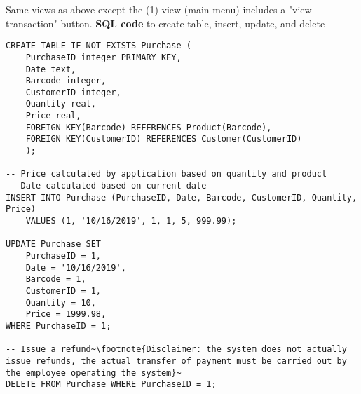 \documentclass[notitlepage,11pt]{article}
\begin{document}
	Same views as above except the (1) view (main menu) includes a "view transaction" button.
\newpage
\textbf{SQL code} to create table, insert, update, and delete
\begin{lstlisting}
CREATE TABLE IF NOT EXISTS Purchase (
	PurchaseID integer PRIMARY KEY,
	Date text,
	Barcode integer, 
	CustomerID integer,
	Quantity real,
	Price real,
	FOREIGN KEY(Barcode) REFERENCES Product(Barcode),
	FOREIGN KEY(CustomerID) REFERENCES Customer(CustomerID)
	);

-- Price calculated by application based on quantity and product 
-- Date calculated based on current date
INSERT INTO Purchase (PurchaseID, Date, Barcode, CustomerID, Quantity, Price) 
	VALUES (1, '10/16/2019', 1, 1, 5, 999.99);

UPDATE Purchase SET
	PurchaseID = 1,
	Date = '10/16/2019',
	Barcode = 1,
	CustomerID = 1,
	Quantity = 10,
	Price = 1999.98,
WHERE PurchaseID = 1;

-- Issue a refund~\footnote{Disclaimer: the system does not actually issue refunds, the actual transfer of payment must be carried out by the employee operating the system}~
DELETE FROM Purchase WHERE PurchaseID = 1;
\end{lstlisting}
\end{document}

